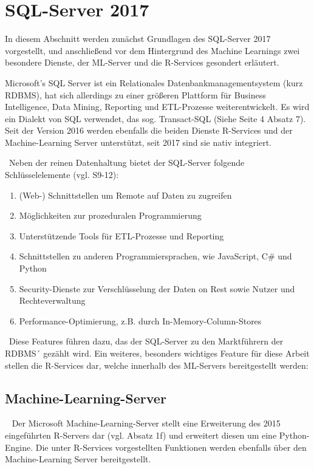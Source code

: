 \section{SQL-Server 2017}
\label{sec:SQLServer}
In diesem Abschnitt werden zunächst Grundlagen des SQL-Server 2017 vorgestellt, und anschließend vor dem Hintergrund des Machine Learnings zwei besondere Dienste, der ML-Server und die R-Services gesondert erläutert. 

Microsoft’s SQL Server ist ein Relationales Datenbankmanagementsystem (kurz RDBMS), hat sich allerdings zu einer größeren Plattform für Business Intelligence, Data Mining, Reporting und ETL-Prozesse weiterentwickelt. Es wird ein Dialekt von SQL verwendet, das sog. Transact-SQL (Siehe \cite{SQLData} Seite 4 Absatz 7). Seit der Version 2016 werden ebenfalls die beiden Dienste R-Services und der Machine-Learning Server unterstützt, seit 2017 sind sie nativ integriert. 

~\newline Neben der reinen Datenhaltung bietet der SQL-Server folgende Schlüsselelemente (vgl. \cite{SQLServerWP} S9-12):
\begin{enumerate}
	\item (Web-) Schnittstellen um Remote auf Daten zu zugreifen
	\item Möglichkeiten zur prozeduralen Programmierung
	\item Unterstützende Tools für ETL-Prozesse und Reporting
	\item Schnittstellen zu anderen Programmiersprachen, wie JavaScript, C\# und Python
	\item Security-Dienste zur Verschlüsselung der Daten on Rest sowie Nutzer und Rechteverwaltung
	\item Performance-Optimierung, z.B. durch In-Memory-Column-Stores
\end{enumerate}

~\newline Diese Features führen dazu, das der SQL-Server zu den Marktführern der RDBMS´ gezählt wird. Ein weiteres, besonders wichtiges Feature für diese Arbeit stellen die R-Services dar, welche innerhalb des ML-Servers bereitgestellt werden:

\subsection{Machine-Learning-Server} ~\newline
Der Microsoft Machine-Learning-Server stellt eine Erweiterung des 2015 eingeführten R-Servers dar (vgl. \cite{MLServerInfo} Absatz 1f) und erweitert diesen um eine Python-Engine. Die unter R-Services vorgestellten Funktionen werden ebenfalls über den Machine-Learning Server bereitgestellt. 

